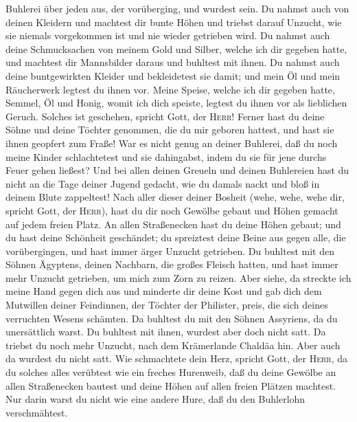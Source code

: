 Buhlerei über jeden aus, der vorüberging, und wurdest sein.
 Du nahmst auch von deinen Kleidern und machtest dir
bunte Höhen und triebst darauf Unzucht, wie sie niemals vorgekommen ist
und nie wieder getrieben wird.  Du nahmst auch deine
Schmucksachen von meinem Gold und Silber, welche ich dir gegeben hatte,
und machtest dir Mannsbilder daraus und buhltest mit ihnen.
 Du nahmst auch deine buntgewirkten Kleider und
bekleidetest sie damit; und mein Öl und mein Räucherwerk legtest du
ihnen vor.  Meine Speise, welche ich dir gegeben hatte,
Semmel, Öl und Honig, womit ich dich speiste, legtest du ihnen vor als
lieblichen Geruch. Solches ist geschehen, spricht Gott, der
\textsc{Herr}!  Ferner hast du deine Söhne und deine
Töchter genommen, die du mir geboren hattest, und hast sie ihnen
geopfert zum Fraße!  War es nicht genug an deiner
Buhlerei, daß du noch meine Kinder schlachtetest und sie dahingabst,
indem du sie für jene durchs Feuer gehen ließest?  Und
bei allen deinen Greueln und deinen Buhlereien hast du nicht an die Tage
deiner Jugend gedacht, wie du damals nackt und bloß in deinem Blute
zappeltest!  Nach aller dieser deiner Bosheit (wehe,
wehe, wehe dir, spricht Gott, der \textsc{Herr}),  hast
du dir noch Gewölbe gebaut und Höhen gemacht auf jedem freien Platz.
 An allen Straßenecken hast du deine Höhen gebaut; und du
hast deine Schönheit geschändet; du spreiztest deine Beine aus gegen
alle, die vorübergingen, und hast immer ärger Unzucht getrieben.
 Du buhltest mit den Söhnen Ägyptens, deinen Nachbarn,
die großes Fleisch hatten, und hast immer mehr Unzucht getrieben, um
mich zum Zorn zu reizen.  Aber siehe, da streckte ich
meine Hand gegen dich aus und minderte dir deine Kost und gab dich dem
Mutwillen deiner Feindinnen, der Töchter der Philister, preis, die sich
deines verruchten Wesens schämten.  Da buhltest du mit
den Söhnen Assyriens, da du unersättlich warst. Du buhltest mit ihnen,
wurdest aber doch nicht satt.  Da triebst du noch mehr
Unzucht, nach dem Krämerlande Chaldäa hin. Aber auch da wurdest du nicht
satt.  Wie schmachtete dein Herz, spricht Gott, der
\textsc{Herr}, da du solches alles verübtest wie ein freches Hurenweib,
 daß du deine Gewölbe an allen Straßenecken bautest und
deine Höhen auf allen freien Plätzen machtest. Nur darin warst du nicht
wie eine andere Hure, daß du den Buhlerlohn verschmähtest.
